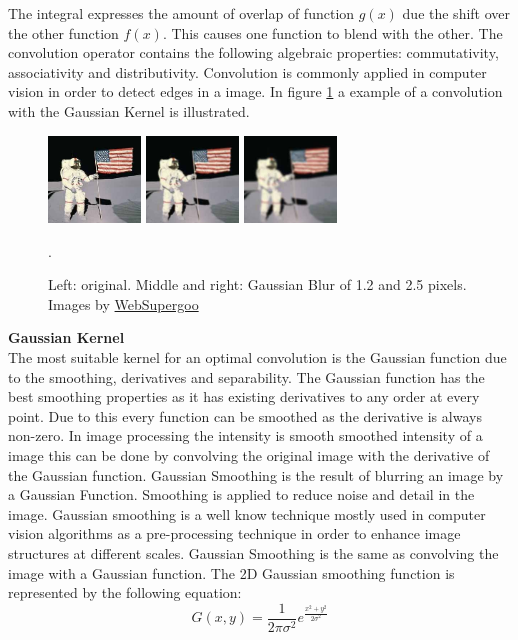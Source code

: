 \documentclass[a4paper]{article}
\begin{document}
\begin{appendices}
The integral expresses the amount of overlap of function $g(x)$
due the shift over the other function $f(x)$. This causes one function to blend with the other. The convolution operator contains the following algebraic properties: commutativity, associativity and distributivity. Convolution is commonly applied in computer vision in order to detect edges in a image. In figure \ref{gaussianblur} a example of a convolution with the Gaussian Kernel is illustrated.
\begin{figure}[!ht]
\centering
\includegraphics[width=0.22\textwidth]{images/gaussianblur_before.jpg}
\includegraphics[width=0.22\textwidth]{images/gaussianblur_after1.jpg}
\includegraphics[width=0.22\textwidth]{images/gaussianblur_after2.jpg}
\caption[Gaussian Blur]{Left: original. Middle and right: Gaussian Blur of 1.2 and 2.5 pixels. Images by \href{http://www.websupergoo.com/helpie/}{WebSupergoo}}.
\label{gaussianblur}
\end{figure}

\noindent\textbf{Gaussian Kernel}\\
The most suitable kernel for an optimal convolution is the Gaussian function due to the smoothing, derivatives and separability. The Gaussian function has the best smoothing properties as it has existing derivatives to any order at every point. Due to this every function can be smoothed as the derivative is always non-zero. In image processing the intensity is smooth smoothed intensity of a image this can be done by convolving the original image with the derivative of the Gaussian function. Gaussian Smoothing is the result of blurring an image by a Gaussian Function. Smoothing is applied to reduce noise and detail in the image. Gaussian smoothing is a well know technique mostly used in computer vision algorithms as a pre-processing technique in order to enhance image structures at different scales. Gaussian Smoothing is the same as convolving the image with a Gaussian function. The 2D Gaussian smoothing function is represented by the following equation:
\begin{equation*}
G(x,y) = \frac{1}{2\pi\sigma^2}e^{\frac{x^2 + y^2}{2\sigma^2}}
\end{equation*}


\end{appendices}
\end{document}
